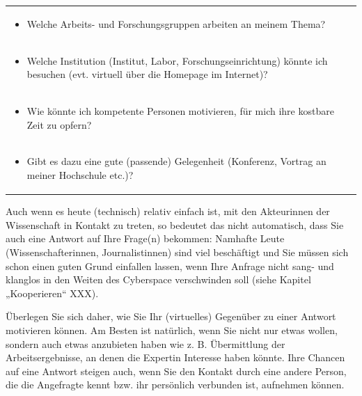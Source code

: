 \documentclass[]{book}
\providecommand{\tightlist}{%
  \setlength{\itemsep}{0pt}\setlength{\parskip}{0pt}}
\theoremstyle{definition}
\theoremstyle{definition}
\theoremstyle{definition}
\theoremstyle{remark}
\begin{document}
\begin{longtable}[]{@{}l@{}}
\begin{minipage}[t]{0.97\columnwidth}
\begin{itemize}
\tightlist
\item
  Welche Arbeits- und Forschungsgruppen arbeiten an meinem Thema?
  \vspace{-6mm}
\end{itemize}\strut
\end{minipage}\tabularnewline
\begin{minipage}[t]{0.97\columnwidth}\raggedright\strut
\begin{itemize}
\tightlist
\item
  Welche Institution (Institut, Labor, Forschungseinrichtung) könnte ich
  besuchen (evt. virtuell über die Homepage im Internet)? \vspace{-6mm}
\end{itemize}\strut
\end{minipage}\tabularnewline
\begin{minipage}[t]{0.97\columnwidth}\raggedright\strut
\begin{itemize}
\tightlist
\item
  Wie könnte ich kompetente Personen motivieren, für mich ihre kostbare
  Zeit zu opfern? \vspace{-6mm}
\end{itemize}\strut
\end{minipage}\tabularnewline
\begin{minipage}[t]{0.97\columnwidth}\raggedright\strut
\begin{itemize}
\tightlist
\item
  Gibt es dazu eine gute (passende) Gelegenheit (Konferenz, Vortrag an
  meiner Hochschule etc.)?
\end{itemize}\strut
\end{minipage}\tabularnewline
\bottomrule
\end{longtable}

Auch wenn es heute (technisch) relativ einfach ist, mit den Akteurinnen
der Wissenschaft in Kontakt zu treten, so bedeutet das nicht
automatisch, dass Sie auch eine Antwort auf Ihre Frage(n) bekommen:
Namhafte Leute (Wissenschafterinnen, Journalistinnen) sind viel
beschäftigt und Sie müssen sich schon einen guten Grund einfallen
lassen, wenn Ihre Anfrage nicht sang- und klanglos in den Weiten des
Cyberspace verschwinden soll (siehe Kapitel „Kooperieren`` XXX).

Überlegen Sie sich daher, wie Sie Ihr (virtuelles) Gegenüber zu einer
Antwort motivieren können. Am Besten ist natürlich, wenn Sie nicht nur
etwas wollen, sondern auch etwas anzubieten haben wie z. B. Übermittlung
der Arbeitsergebnisse, an denen die Expertin Interesse haben könnte.
Ihre Chancen auf eine Antwort steigen auch, wenn Sie den Kontakt durch
eine andere Person, die die Angefragte kennt bzw. ihr persönlich
verbunden ist, aufnehmen können.
\end{document}
